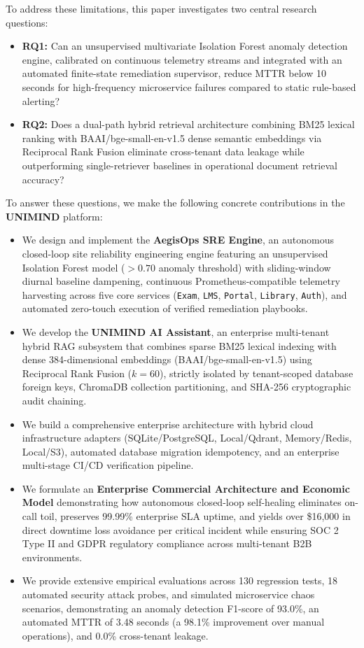 \documentclass[12pt,onecolumn,draftclsnofoot]{IEEEtran}
\begin{document}
To address these limitations, this paper investigates two central research questions:
\begin{itemize}
    \item \textbf{RQ1:} Can an unsupervised multivariate Isolation Forest anomaly detection engine, calibrated on continuous telemetry streams and integrated with an automated finite-state remediation supervisor, reduce MTTR below 10 seconds for high-frequency microservice failures compared to static rule-based alerting?
    \item \textbf{RQ2:} Does a dual-path hybrid retrieval architecture combining BM25 lexical ranking with BAAI/bge-small-en-v1.5 dense semantic embeddings via Reciprocal Rank Fusion eliminate cross-tenant data leakage while outperforming single-retriever baselines in operational document retrieval accuracy?
\end{itemize}

To answer these questions, we make the following concrete contributions in the \textbf{UNIMIND} platform:
\begin{itemize}
    \item We design and implement the \textbf{AegisOps SRE Engine}, an autonomous closed-loop site reliability engineering engine featuring an unsupervised Isolation Forest model ($>0.70$ anomaly threshold) with sliding-window diurnal baseline dampening, continuous Prometheus-compatible telemetry harvesting across five core services (\texttt{Exam}, \texttt{LMS}, \texttt{Portal}, \texttt{Library}, \texttt{Auth}), and automated zero-touch execution of verified remediation playbooks.
    \item We develop the \textbf{UNIMIND AI Assistant}, an enterprise multi-tenant hybrid RAG subsystem that combines sparse BM25 lexical indexing with dense 384-dimensional embeddings (BAAI/bge-small-en-v1.5) using Reciprocal Rank Fusion ($k=60$), strictly isolated by tenant-scoped database foreign keys, ChromaDB collection partitioning, and SHA-256 cryptographic audit chaining.
    \item We build a comprehensive enterprise architecture with hybrid cloud infrastructure adapters (SQLite/PostgreSQL, Local/Qdrant, Memory/Redis, Local/S3), automated database migration idempotency, and an enterprise multi-stage CI/CD verification pipeline.
    \item We formulate an \textbf{Enterprise Commercial Architecture and Economic Model} demonstrating how autonomous closed-loop self-healing eliminates on-call toil, preserves 99.99\% enterprise SLA uptime, and yields over \$16,000 in direct downtime loss avoidance per critical incident while ensuring SOC 2 Type II and GDPR regulatory compliance across multi-tenant B2B environments.
    \item We provide extensive empirical evaluations across 130 regression tests, 18 automated security attack probes, and simulated microservice chaos scenarios, demonstrating an anomaly detection F1-score of 93.0\%, an automated MTTR of 3.48 seconds (a 98.1\% improvement over manual operations), and 0.0\% cross-tenant leakage.
\end{itemize}
\end{document}
